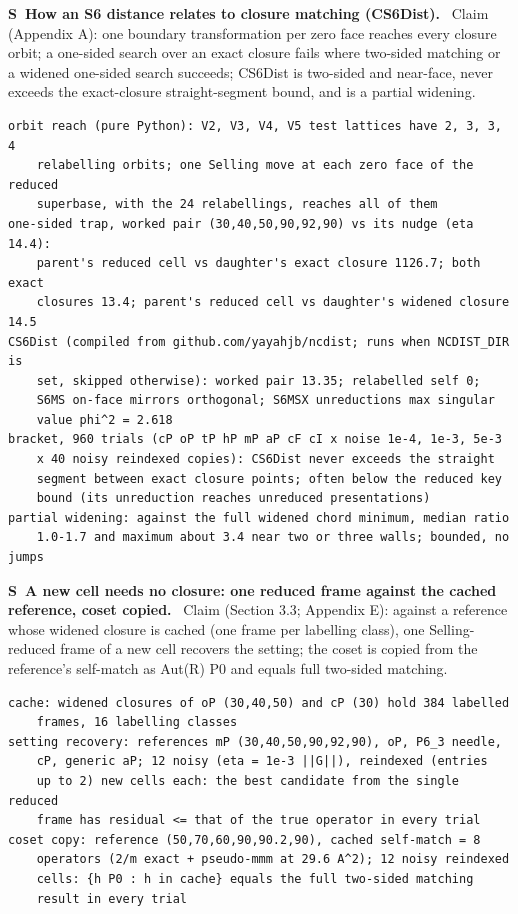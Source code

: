 \documentclass[11pt]{article}
\newcounter{scheck}
\renewcommand{\thescheck}{S\arabic{scheck}}
\newcommand{\sitem}[2]{\medskip\noindent\refstepcounter{scheck}\label{#1}\textbf{\thescheck\ #2.}\ }
\begin{document}
\sitem{z:s6dist}{How an S6 distance relates to closure matching (CS6Dist)}
Claim (Appendix A): one boundary transformation per zero face reaches every closure orbit; a one-sided search over an exact closure fails where two-sided matching or a widened one-sided search succeeds; CS6Dist is two-sided and near-face, never exceeds the exact-closure straight-segment bound, and is a partial widening.
\begin{footnotesize}\begin{verbatim}
orbit reach (pure Python): V2, V3, V4, V5 test lattices have 2, 3, 3, 4
    relabelling orbits; one Selling move at each zero face of the reduced
    superbase, with the 24 relabellings, reaches all of them
one-sided trap, worked pair (30,40,50,90,92,90) vs its nudge (eta 14.4):
    parent's reduced cell vs daughter's exact closure 1126.7; both exact
    closures 13.4; parent's reduced cell vs daughter's widened closure 14.5
CS6Dist (compiled from github.com/yayahjb/ncdist; runs when NCDIST_DIR is
    set, skipped otherwise): worked pair 13.35; relabelled self 0;
    S6MS on-face mirrors orthogonal; S6MSX unreductions max singular
    value phi^2 = 2.618
bracket, 960 trials (cP oP tP hP mP aP cF cI x noise 1e-4, 1e-3, 5e-3
    x 40 noisy reindexed copies): CS6Dist never exceeds the straight
    segment between exact closure points; often below the reduced key
    bound (its unreduction reaches unreduced presentations)
partial widening: against the full widened chord minimum, median ratio
    1.0-1.7 and maximum about 3.4 near two or three walls; bounded, no jumps
\end{verbatim}\end{footnotesize}

\sitem{z:single-frame}{A new cell needs no closure: one reduced frame against the cached reference, coset copied}
Claim (Section 3.3; Appendix E): against a reference whose widened closure is cached (one frame per labelling class), one Selling-reduced frame of a new cell recovers the setting; the coset is copied from the reference's self-match as Aut(R) P0 and equals full two-sided matching.
\begin{footnotesize}\begin{verbatim}
cache: widened closures of oP (30,40,50) and cP (30) hold 384 labelled
    frames, 16 labelling classes
setting recovery: references mP (30,40,50,90,92,90), oP, P6_3 needle,
    cP, generic aP; 12 noisy (eta = 1e-3 ||G||), reindexed (entries
    up to 2) new cells each: the best candidate from the single reduced
    frame has residual <= that of the true operator in every trial
coset copy: reference (50,70,60,90,90.2,90), cached self-match = 8
    operators (2/m exact + pseudo-mmm at 29.6 A^2); 12 noisy reindexed
    cells: {h P0 : h in cache} equals the full two-sided matching
    result in every trial
\end{verbatim}\end{footnotesize}
\end{document}
